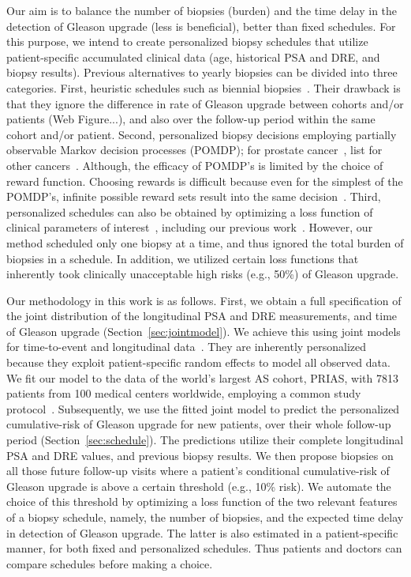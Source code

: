 Our aim is to balance the number of biopsies (burden) and the time delay in the detection of Gleason upgrade (less is beneficial), better than fixed schedules. For this purpose, we intend to create personalized biopsy schedules that utilize patient-specific accumulated clinical data (age, historical PSA and DRE, and biopsy results). Previous alternatives to yearly biopsies can be divided into three categories. First, heuristic schedules such as biennial biopsies~\citep{inoue2018comparative}. Their drawback is that they ignore the difference in rate of Gleason upgrade between cohorts and/or patients (Web Figure...), and also over the follow-up period within the same cohort and/or patient. Second, personalized biopsy decisions employing partially observable Markov decision processes (POMDP); for prostate cancer~\citep{zhang2012optimization,barnett2018optimizing}, list for other cancers~\citep{alagoz2010operations}. Although, the efficacy of POMDP's is limited by the choice of reward function. Choosing rewards is difficult because even for the simplest of the POMDP's, infinite possible reward sets result into the same decision~\citep{vickers2006decision}. Third, personalized schedules can also be obtained by optimizing a loss function of clinical parameters of interest~\citep{bebu2017optimal,rizopoulos2015personalized}, including our previous work~\citep{tomer2019personalized}. However, our method scheduled only one biopsy at a time, and thus ignored the total burden of biopsies in a schedule. In addition, we utilized certain loss functions that inherently took clinically unacceptable high risks (e.g., 50\%) of Gleason upgrade. 

Our methodology in this work is as follows. First, we obtain a full specification of the joint distribution of the longitudinal PSA and DRE measurements, and time of Gleason upgrade (Section~\ref{sec:jointmodel}). We achieve this using joint models for time-to-event and longitudinal data~\citep{tsiatis2004joint,rizopoulos2012joint}. They are inherently personalized because they exploit patient-specific random effects to model all observed data. We fit our model to the data of the world's largest AS cohort, PRIAS, with 7813 patients from 100 medical centers worldwide, employing a common study protocol~\citep{bokhorst2016decade}. Subsequently, we use the fitted joint model to predict the personalized cumulative-risk of Gleason upgrade for new patients, over their whole follow-up period (Section~\ref{sec:schedule}). The predictions utilize their complete longitudinal PSA and DRE values, and previous biopsy results. We then propose biopsies on all those future follow-up visits where a patient's conditional cumulative-risk of Gleason upgrade is above a certain threshold (e.g., 10\% risk). We automate the choice of this threshold by optimizing a loss function of the two relevant features of a biopsy schedule, namely, the number of biopsies, and the expected time delay in detection of Gleason upgrade. The latter is also estimated in a patient-specific manner, for both fixed and personalized schedules. Thus patients and doctors can compare schedules before making a choice.

